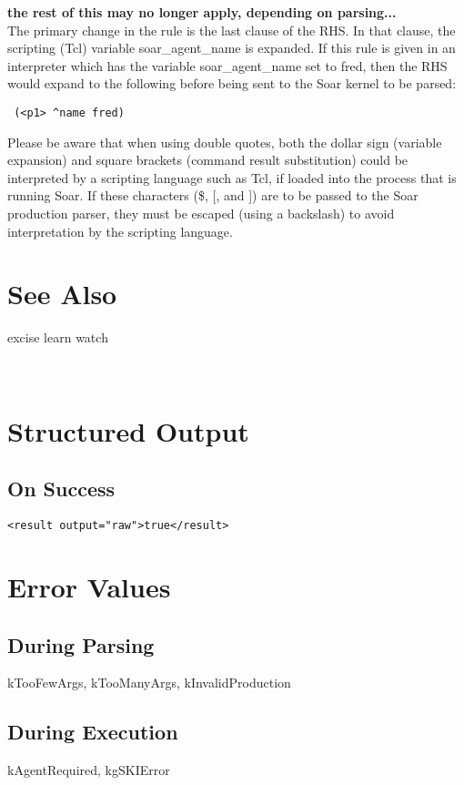 \documentclass[10pt]{article}
\begin{document}
 \textbf{ the rest of this may no longer apply, depending on parsing...}
\\ 
 The primary change in the rule is the last clause of the RHS. In that clause, the scripting (Tcl) variable soar\_agent\_name is expanded. If this rule is given in an interpreter which has the variable soar\_agent\_name set to fred, then the RHS would expand to the following before being sent to the Soar kernel to be parsed: \begin{verbatim}
 (<p1> ^name fred)

\end{verbatim}



 Please be aware that when using double quotes, both the dollar sign (variable expansion) and square brackets (command result substitution) could be interpreted by a scripting language such as Tcl, if loaded into the process that is running Soar. If these characters (\$, [, and ]) are to be passed to the Soar production parser, they must be escaped (using a backslash) to avoid interpretation by the scripting language. 
\section*{ See Also }


 excise learn watch


 \\ 

\section*{ Structured Output }
\subsection*{ On Success }
\begin{verbatim}
<result output="raw">true</result>

\end{verbatim}
\section*{ Error Values }
\subsection*{ During Parsing }


 kTooFewArgs, kTooManyArgs, kInvalidProduction
\subsection*{ During Execution }


 kAgentRequired, kgSKIError
\end{document}
